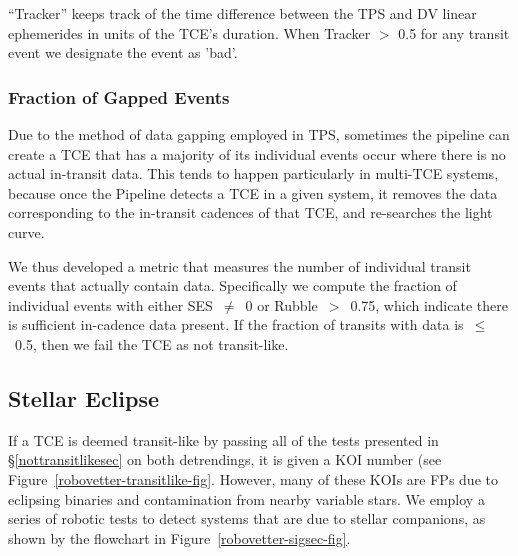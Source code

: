 ``Tracker'' keeps track of the time difference between the TPS and DV linear ephemerides in units of the TCE's duration. When Tracker $>$ 0.5 for any transit event we designate the event as 'bad'.


\subsubsection{Fraction of Gapped Events}
\label{s:rocky}

Due to the method of data gapping employed in TPS, sometimes the \kepler{} pipeline can create a TCE that has a majority of its individual events occur where there is no actual in-transit data. This tends to happen particularly in multi-TCE systems, because once the \kepler{} Pipeline detects a TCE in a given system, it removes the data corresponding to the in-transit cadences of that TCE, and re-searches the light curve. 

We thus developed a metric that measures the number of individual transit events that actually contain data. Specifically we compute the fraction of individual events with either SES~$\ne$~0 or Rubble~$>$~0.75, which indicate there is sufficient in-cadence data present. If the fraction of transits with data is~$\le$~0.5, then we fail the TCE as not transit-like.



\subsection{Stellar Eclipse}
\label{sigsecsec}

If a TCE is deemed transit-like by passing all of the tests presented in \S\ref{nottransitlikesec} on both detrendings, it is given a KOI number (see Figure~\ref{robovetter-transitlike-fig}.
However, many of these KOIs are FPs due to eclipsing binaries and contamination from nearby variable stars. We employ a series of robotic tests to detect systems that are due to stellar companions, as shown by the flowchart in Figure~\ref{robovetter-sigsec-fig}.



